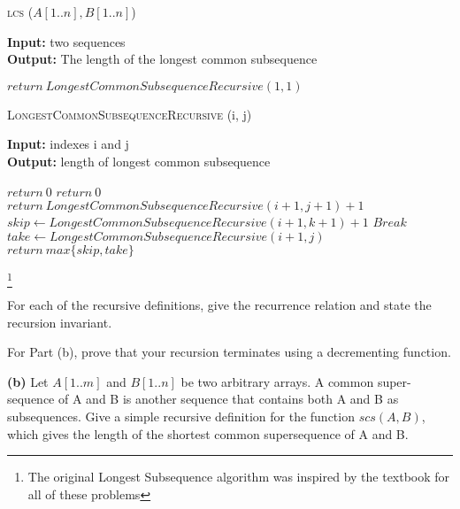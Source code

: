 \documentclass{article}
\begin{document}
\begin{algorithm} \caption{\textsc{lcs} ($A[1..n], B[1..n]$)}\label{alg:seb}
    {\bf Input:} two sequences\\
    {\bf Output:} The length of the longest common subsequence
    \begin{algorithmic}[1]
        \State$return\ LongestCommonSubsequenceRecursive(1, 1)$
    \end{algorithmic}
\end{algorithm}

\begin{algorithm} \caption{\textsc{LongestCommonSubsequenceRecursive} (i, j)}\label{alg:seb}
    {\bf Input:} indexes i and j\\
    {\bf Output:} length of longest common subsequence
    \begin{algorithmic}[1]
            \State$return\ 0$
            \State$return\ 0$
            \State$return\ LongestCommonSubsequenceRecursive(i+1, j+1) +1$
        \Else{}
                    \State$skip \gets LongestCommonSubsequenceRecursive(i+1, k+1) +1$
                    \State$Break$
                \EndIf{}
            \EndFor{}
            \State$take \gets LongestCommonSubsequenceRecursive(i+1, j)$
            \State$return\ max\{skip, take\}$
        \EndIf{}
    \end{algorithmic}
\end{algorithm}

\footnote{The original Longest Subsequence algorithm was inspired by the textbook for all of these problems}

\todo{}




For each of the recursive definitions, give the recurrence
relation and state the recursion invariant.

For Part (b), prove that your recursion terminates
using a decrementing function.

{\bf (b)} Let $A[1.. m]$ and $B[1.. n]$ be two arbitrary arrays. A common super-
sequence of A and B is another sequence that contains both A and B
as subsequences. Give a simple recursive definition for the function
$scs(A, B)$, which gives the length of the shortest common supersequence
of A and B.
\end{document}
